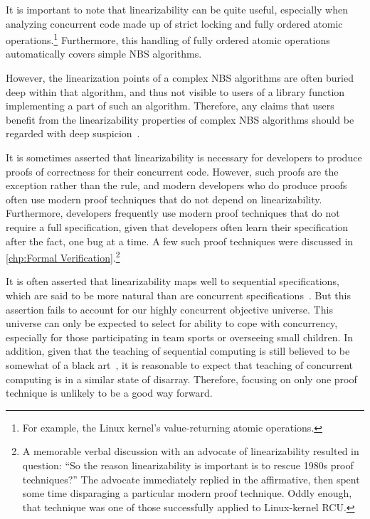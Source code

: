 It is important to note that linearizability can be quite useful,
especially when analyzing concurrent code made up of strict locking
and fully ordered atomic operations.\footnote{
	For example, the Linux kernel's value-returning atomic operations.}
Furthermore, this handling of fully ordered atomic operations
automatically covers simple NBS algorithms.

However, the linearization points of a complex NBS algorithms are often
buried deep within that algorithm, and thus not visible to users of
a library function implementing a part of such an algorithm.
Therefore, any claims that users benefit from the linearizability properties
of complex NBS algorithms should be regarded with deep
suspicion~\cite{AndreasHaas2012FIFOisnt}.

It is sometimes asserted that linearizability is necessary for developers
to produce proofs of correctness for their concurrent code.
However, such proofs are the exception rather than the rule, and modern
developers who do produce proofs often use modern proof techniques that
do not depend on linearizability.
Furthermore, developers frequently use modern proof techniques that do
not require a full specification, given that developers often learn
their specification after the fact, one bug at a time.
A few such proof techniques were discussed in
\cref{chp:Formal Verification}.\footnote{
	A memorable verbal discussion with an advocate of linearizability
	resulted in question:
	``So the reason linearizability is important is to rescue 1980s
	proof techniques?''
	The advocate immediately replied in the affirmative, then spent
	some time disparaging a particular modern proof technique.
	Oddly enough, that technique was one of those successfully
	applied to Linux-kernel RCU\@.}

It is often asserted that linearizability maps well to sequential
specifications, which are said to be more natural than are concurrent
specifications~\cite{SergioRajsbaum2020HistoryLinearizability}.
But this assertion fails to account for our highly concurrent objective
universe.
This universe can only be expected to select for ability to cope with
concurrency, especially for those participating in team sports or
overseeing small children.
In addition, given that the teaching of sequential
computing is still believed to be somewhat of a black
art~\cite{ElizabethPatitsas2020GradesNotBimodal}, it is reasonable
to expect that teaching of concurrent computing is in a similar state
of disarray.
Therefore, focusing on only one proof technique is unlikely to be a
good way forward.

